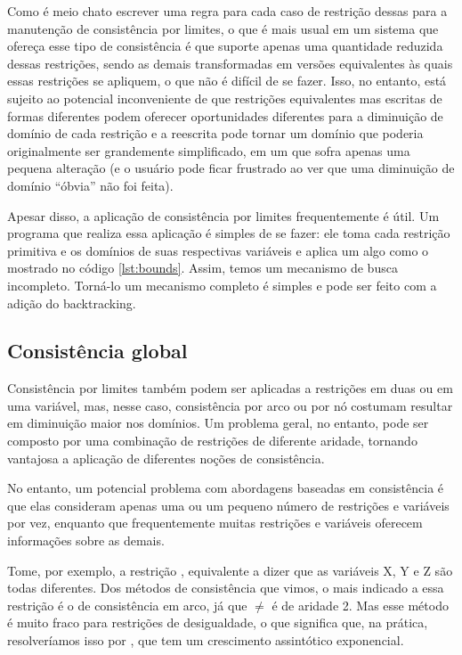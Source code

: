 Como é meio chato escrever uma regra para cada caso de restrição dessas para a manutenção de consistência por limites, o que é
mais usual em um sistema que ofereça esse tipo de consistência é que suporte apenas uma quantidade reduzida dessas restrições,
sendo as demais transformadas em versões equivalentes às quais essas restrições se apliquem, o que não é difícil de se fazer.
Isso, no entanto, está sujeito ao potencial inconveniente de que restrições equivalentes mas escritas de formas diferentes podem oferecer
oportunidades diferentes para a diminuição de domínio de cada restrição e a reescrita pode tornar um domínio que poderia
originalmente ser grandemente simplificado, em um que sofra apenas uma pequena alteração (e o
usuário pode ficar frustrado ao ver que uma diminuição de domínio ``óbvia'' não foi feita).

Apesar disso, a aplicação de consistência por limites frequentemente é útil. Um programa que realiza essa aplicação é simples
de se fazer: ele toma cada restrição primitiva e os domínios de suas respectivas variáveis e aplica um algo como o mostrado no
código \ref{lst:bounds}. Assim, temos um mecanismo de busca incompleto. Torná-lo um mecanismo completo é simples e pode ser feito
com a adição do backtracking.


\subsection{Consistência global}

Consistência por limites também podem ser aplicadas a restrições em duas ou em uma variável, mas, nesse caso, consistência por
arco ou por nó costumam resultar em diminuição maior nos domínios. Um problema geral, no entanto, pode ser composto por uma
combinação de restrições de diferente aridade, tornando vantajosa a aplicação de diferentes noções de consistência.

No entanto, um potencial problema com abordagens baseadas em consistência é que elas consideram apenas uma ou um pequeno número de
restrições e variáveis por vez, enquanto que frequentemente muitas restrições e variáveis oferecem informações sobre as demais.

Tome, por exemplo, a restrição , equivalente a dizer que as variáveis X, Y e Z são todas
diferentes. Dos métodos de consistência que vimos, o mais indicado a essa restrição é o de consistência em arco, já que $\neq$ é
de aridade 2. Mas esse método é muito fraco para restrições de desigualdade, o que significa que, na
prática, resolveríamos isso por , que tem um crescimento assintótico exponencial.%

